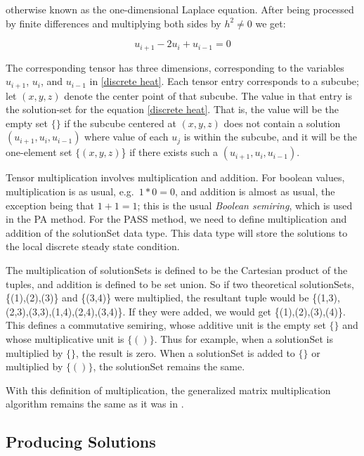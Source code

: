 \documentclass[11pt]{article}
\begin{document}
\noindent otherwise known as the one-dimensional Laplace equation. After being processed by finite differences and multiplying both sides by $h^2 \ne 0$ we get: 

\begin{equation}
    \label{discrete heat}
    u_{i+1} - 2u_i + u_{i-1} = 0
\end{equation}

\noindent The corresponding tensor has three dimensions, corresponding to the variables $u_{i+1}$, $u_i$, and $u_{i-1}$ in \cref{discrete heat}. Each tensor entry corresponds to a subcube; let $(x,y,z)$ denote the center point of that subcube. The value in that entry is the solution-set for the equation \cref{discrete heat}. That is, the value will be the empty set $\{\}$ if the subcube centered at $(x,y,z)$ does not contain a solution $(u_{i+1}, u_i, u_{i-1})$ where value of each $u_j$ is within the subcube, and it will be the one-element set $\{(x,y,z)$\} if there exists such a $(u_{i+1}, u_i, u_{i-1})$.

Tensor multiplication involves multiplication and addition. For boolean values, multiplication is as usual, e.g.\ $1*0=0$, and addition is almost as usual, the exception being that $1+1=1$; this is the usual \emph{Boolean semiring}, which is used in the PA method. For the PASS method, we need to define multiplication and addition of the solutionSet data type. This data type will store the solutions to the local discrete steady state condition.

The multiplication of solutionSets is defined to be the Cartesian product of the tuples, and addition is defined to be set union. So if two theoretical solutionSets, \{(1),(2),(3)\} and \{(3,4)\} were multiplied, the resultant tuple would be \{(1,3),(2,3),(3,3),(1,4),(2,4),(3,4)\}. If they were added, we would get \{(1),(2),(3),(4)\}. This defines a commutative semiring, whose additive unit is the empty set $\{\}$ and whose multiplicative unit is $\{()\}$. Thus for example, when a solutionSet is multiplied by $\{\}$, the result is zero. When a solutionSet is added to $\{\}$ or multiplied by $\{()\}$, the solutionSet remains the same.

With this definition of multiplication, the generalized matrix multiplication algorithm remains the same as it was in \citep{Introduction_to_PA}.

\subsection{Producing Solutions}
\end{document}
